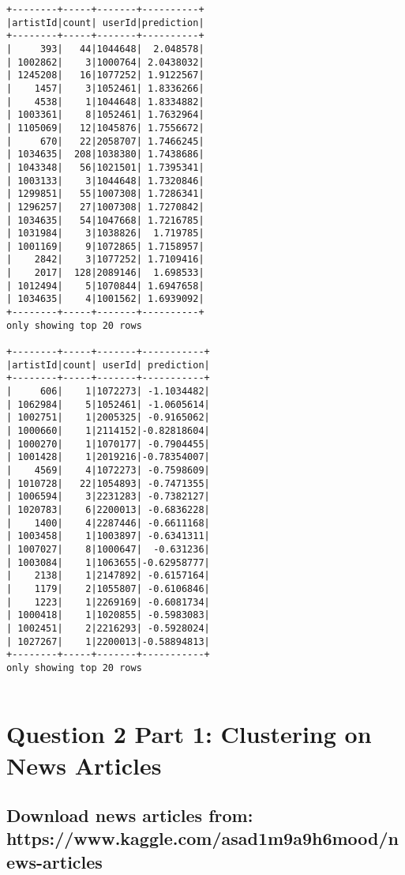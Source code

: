 \documentclass{report}
\begin{document}
    \begin{Verbatim}[commandchars=\\\{\}]
+--------+-----+-------+----------+
|artistId|count| userId|prediction|
+--------+-----+-------+----------+
|     393|   44|1044648|  2.048578|
| 1002862|    3|1000764| 2.0438032|
| 1245208|   16|1077252| 1.9122567|
|    1457|    3|1052461| 1.8336266|
|    4538|    1|1044648| 1.8334882|
| 1003361|    8|1052461| 1.7632964|
| 1105069|   12|1045876| 1.7556672|
|     670|   22|2058707| 1.7466245|
| 1034635|  208|1038380| 1.7438686|
| 1043348|   56|1021501| 1.7395341|
| 1003133|    3|1044648| 1.7320846|
| 1299851|   55|1007308| 1.7286341|
| 1296257|   27|1007308| 1.7270842|
| 1034635|   54|1047668| 1.7216785|
| 1031984|    3|1038826|  1.719785|
| 1001169|    9|1072865| 1.7158957|
|    2842|    3|1077252| 1.7109416|
|    2017|  128|2089146|  1.698533|
| 1012494|    5|1070844| 1.6947658|
| 1034635|    4|1001562| 1.6939092|
+--------+-----+-------+----------+
only showing top 20 rows

+--------+-----+-------+-----------+
|artistId|count| userId| prediction|
+--------+-----+-------+-----------+
|     606|    1|1072273| -1.1034482|
| 1062984|    5|1052461| -1.0605614|
| 1002751|    1|2005325| -0.9165062|
| 1000660|    1|2114152|-0.82818604|
| 1000270|    1|1070177| -0.7904455|
| 1001428|    1|2019216|-0.78354007|
|    4569|    4|1072273| -0.7598609|
| 1010728|   22|1054893| -0.7471355|
| 1006594|    3|2231283| -0.7382127|
| 1020783|    6|2200013| -0.6836228|
|    1400|    4|2287446| -0.6611168|
| 1003458|    1|1003897| -0.6341311|
| 1007027|    8|1000647|  -0.631236|
| 1003084|    1|1063655|-0.62958777|
|    2138|    1|2147892| -0.6157164|
|    1179|    2|1055807| -0.6106846|
|    1223|    1|2269169| -0.6081734|
| 1000418|    1|1020855| -0.5983083|
| 1002451|    2|2216293| -0.5928024|
| 1027267|    1|2200013|-0.58894813|
+--------+-----+-------+-----------+
only showing top 20 rows


    \end{Verbatim}

\chapter{Question 2 Part 1: Clustering on News
Articles}\label{question-2-part-1-clustering-on-news-articles}

\section{Download news articles from:
https://www.kaggle.com/asad1m9a9h6mood/news-articles}\label{download-news-articles-from-httpswww.kaggle.comasad1m9a9h6moodnews-articles}
\end{document}
